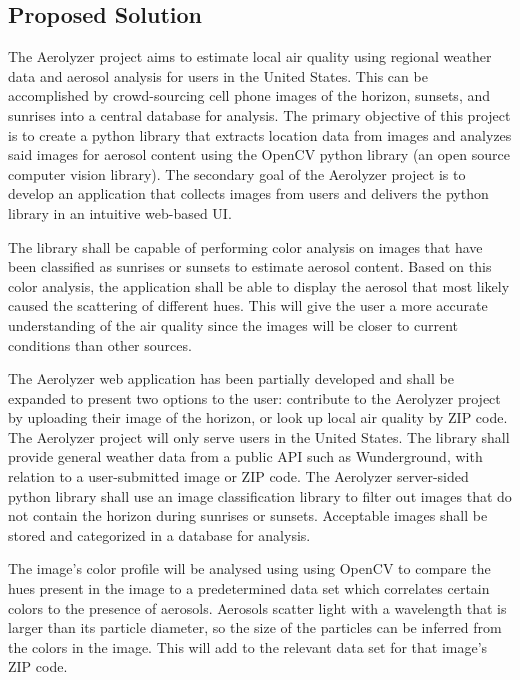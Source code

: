 \documentclass[letterpaper,10pt,draftclsnofoot,onecolumn]{IEEEtran}
\newcommand\tab[1][1cm]{\hspace*{#1}}
\begin{document}
\begin{flushleft}
\section{Proposed Solution}
\tab The Aerolyzer project aims to estimate local air quality using regional weather data and aerosol analysis for users in the United States. This can be accomplished by crowd-sourcing cell phone images of the horizon, sunsets, and sunrises into a central database for analysis. The primary objective of this project is to create a python library that extracts location data from images and analyzes said images for aerosol content using the OpenCV python library (an open source computer vision library). The secondary goal of the Aerolyzer project is to develop an application that collects images from users and delivers the python library in an intuitive web-based UI. 
\par
\tab The library  shall be capable of performing color analysis on images that have been classified as sunrises or sunsets to estimate aerosol content. Based on this color analysis, the application shall be able to display the aerosol that most likely caused the scattering of different hues. This will give the user a more accurate understanding of the air quality since the images will be closer to current conditions than other sources.
\par
\tab The Aerolyzer web application has been partially developed and shall be expanded to present two options to the user: contribute to the Aerolyzer project by uploading their image of the horizon, or look up local air quality by ZIP code. The Aerolyzer project will only serve users in the United States. The library shall provide general weather data from a public API such as Wunderground, with relation to a user-submitted image or ZIP code. The Aerolyzer server-sided python library shall use an image classification library to filter out images that do not contain the horizon during sunrises or sunsets. Acceptable images shall be stored and categorized in a database for analysis. 
\par
\tab The image's color profile will be analysed using using OpenCV to compare the hues present in the image to a predetermined data set which correlates certain colors to the presence of aerosols. Aerosols scatter light with a wavelength that is larger than its particle diameter, so the size of the particles can be inferred from the colors in the image. This will add to the relevant data set for that image's ZIP code. 


\end{flushleft}
\end{document}
